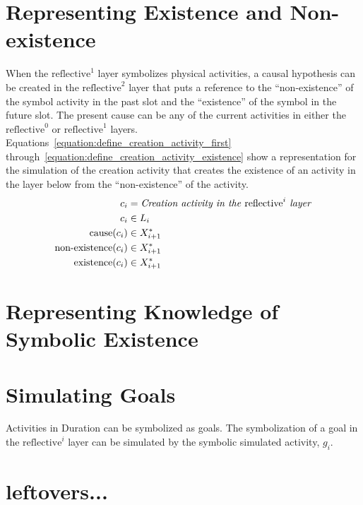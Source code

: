 \section{Representing Existence and Non-existence}

When the $\text{reflective}^1$ layer symbolizes physical activities, a
causal hypothesis can be created in the $\text{reflective}^2$ layer
that puts a reference to the ``non-existence'' of the symbol activity
in the past slot and the ``existence'' of the symbol in the future
slot.  The present cause can be any of the current activities in
either the $\text{reflective}^0$ or $\text{reflective}^1$ layers.
{\mbox{Equations~\ref{equation:define_creation_activity_first}}}
{\mbox{through~\ref{equation:define_creation_activity_existence}}}
show a representation for the simulation of the creation activity that
creates the existence of an activity in the layer below from the
``non-existence'' of the activity.
\begin{align}
\label{equation:define_creation_activity_first}
                      c_i &= \text{\emph{Creation activity in the} reflective}^i\text{\emph{ layer}} \\
                      c_i &\in L_i \\
\label{equation:define_creation_activity_cause}
        \text{cause}(c_i) &\in X_{i+1}^* \\
\label{equation:define_creation_activity_non_existence}
\text{non-existence}(c_i) &\in X_{i+1}^* \\
\label{equation:define_creation_activity_existence}
    \text{existence}(c_i) &\in X_{i+1}^*
\end{align}

\section{Representing Knowledge of Symbolic Existence}


\section{Simulating Goals}

Activities in Duration can be symbolized as goals.  The symbolization
of a goal in the $\text{reflective}^i$ layer can be simulated by the
symbolic simulated activity, $g_i$.

\section{leftovers...}

